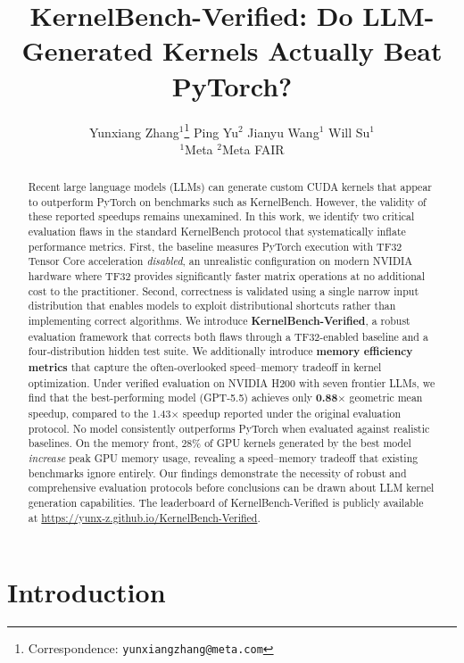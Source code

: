 \documentclass[11pt]{article}
\title{\textbf{KernelBench-Verified: Do LLM-Generated Kernels Actually Beat PyTorch?}}
\author{%
Yunxiang Zhang$^{1}$\thanks{Correspondence: \texttt{yunxiangzhang@meta.com}} \quad
Ping Yu$^{2}$ \quad
Jianyu Wang$^{1}$ \quad
Will Su$^{1}$ \\[6pt]
$^{1}$Meta \quad $^{2}$Meta FAIR}
\date{}
\begin{document}
\maketitle

\begin{abstract}
Recent large language models (LLMs) can generate custom CUDA kernels that appear to outperform PyTorch on benchmarks such as KernelBench. However, the validity of these reported speedups remains unexamined. In this work, we identify two critical evaluation flaws in the standard KernelBench protocol that systematically inflate performance metrics. First, the baseline measures PyTorch execution with TF32 Tensor Core acceleration \emph{disabled}, an unrealistic configuration on modern NVIDIA hardware where TF32 provides significantly faster matrix operations at no additional cost to the practitioner. Second, correctness is validated using a single narrow input distribution that enables models to exploit distributional shortcuts rather than implementing correct algorithms. We introduce \textbf{KernelBench-Verified}, a robust evaluation framework that corrects both flaws through a TF32-enabled baseline and a four-distribution hidden test suite. We additionally introduce \textbf{memory efficiency metrics} that capture the often-overlooked speed--memory tradeoff in kernel optimization.
Under verified evaluation on NVIDIA H200 with seven frontier LLMs, we find that the best-performing model (GPT-5.5) achieves only \textbf{0.88$\times$} geometric mean speedup, compared to the 1.43$\times$ speedup reported under the original evaluation protocol.
No model consistently outperforms PyTorch when evaluated against realistic baselines.
On the memory front, 28\% of GPU kernels generated by the best model \emph{increase} peak GPU memory usage, revealing a speed--memory tradeoff that existing benchmarks ignore entirely.
Our findings demonstrate the necessity of robust and comprehensive evaluation protocols before conclusions can be drawn about LLM kernel generation capabilities.
The leaderboard of KernelBench-Verified is publicly available at \url{https://yunx-z.github.io/KernelBench-Verified}.
\end{abstract}

\section{Introduction}
\label{sec:intro}
\end{document}
